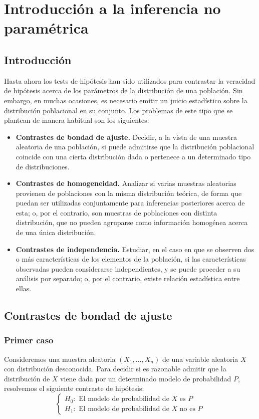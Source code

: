 \chapter{Introducción a la inferencia no paramétrica}
\section{Introducción}
Hasta ahora los tests de hipótesis han sido utilizados para contrastar la veracidad de hipótesis acerca de los parámetros de la distribución de una población.
Sin embargo, en muchas ocasiones, es necesario emitir un juicio estadístico sobre la distribución poblacional en su conjunto.
Los problemas de este tipo que se plantean de manera habitual son los siguientes:
\begin{itemize}
    \item \textbf{Contrastes de bondad de ajuste.}
          Decidir, a la vista de una muestra aleatoria de una población, si puede admitirse que la distribución poblacional coincide con una cierta distribución dada o pertenece a un determinado tipo de distribuciones.
    \item \textbf{Contrastes de homogeneidad.}
          Analizar si varias muestras aleatorias provienen de poblaciones con la misma distribución teórica, de forma que puedan ser utilizadas conjuntamente para inferencias posteriores acerca de esta; o, por el contrario, son muestras de poblaciones con distinta distribución, que no pueden agruparse como información homogénea acerca de una única distribución.
    \item \textbf{Contrastes de independencia.}
          Estudiar, en el caso en que se observen dos o más características de los elementos de la población, si las características observadas pueden considerarse independientes, y se puede proceder a su análisis por separado; o, por el contrario, existe relación estadística entre ellas.
\end{itemize}

\section{Contrastes de bondad de ajuste}
\subsection*{Primer caso}
Consideremos una muestra aleatoria $(X_1, \dots, X_n)$ de una variable aleatoria $X$ con distribución desconocida.
Para decidir si es razonable admitir que la distribución de $X$ viene dada por un determinado modelo de probabilidad $P$, resolvemos el siguiente contraste de hipótesis:
$$\begin{cases}
        H_0: \text{ El modelo de probabilidad de } X \text{ es } P \\
        H_1: \text{ El modelo de probabilidad de } X \text{ no es } P
    \end{cases}$$

